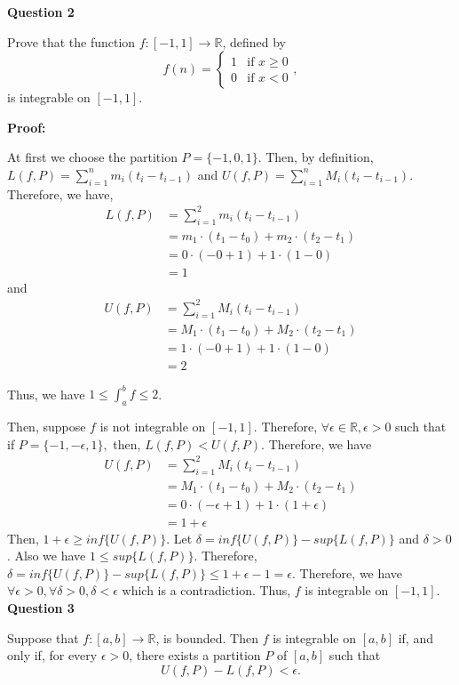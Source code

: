 \documentclass[a4paper,12pt]{report}
\newcommand{\R}{\mathbb{R}}
\begin{document}
\noindent
\textbf{Question 2}

\noindent
Prove that the function $f:[-1,1]\to\R$,
defined by 
\[
f(n) = \begin{cases} 1 &\mbox{if } x\geq 0 \\
0 & \mbox{if } x<0 \end{cases},
\]
is integrable on $[-1,1]$. 

\noindent
\textbf{Proof:}

\noindent
At first we choose the partition $P=\{-1,0,1\}$. Then, by definition, $L(f,P)=\sum_{i=1}^{n}m_i(t_i-t_{i-1})$ and $U(f,P)=\sum_{i=1}^{n}M_i(t_i-t_{i-1})$. Therefore, we have, 
\begin{align*}
L(f,P)&=\sum_{i=1}^{2}m_i(t_i-t_{i-1})\\
&=m_1\cdot{(t_1-t_0)}+m_2\cdot{(t_2-t_1)}\\
&=0\cdot{(-0+1)}+1\cdot{(1-0)}\\
&=1
\end{align*}
and 
\begin{align*}
U(f,P)&=\sum_{i=1}^{2}M_i(t_i-t_{i-1})\\
&=M_1\cdot{(t_1-t_0)}+M_2\cdot{(t_2-t_1)}\\
&=1\cdot{(-0+1)} + 1\cdot{(1-0)}\\
&=2
\end{align*}

\noindent
Thus, we have $1\leq \int_{a}^{b}f\leq 2$.

\noindent
Then, suppose $f$ is not integrable on $[-1,1]$. Therefore, $\forall \epsilon\in \mathbb{R}, \epsilon>0$ such that if $P=\{-1,-\epsilon,1\},$ then, $L(f,P)<U(f,P)$. Therefore, we have 
\begin{align*}
U(f,P)&=\sum_{i=1}^{2}M_i(t_i-t_{i-1})\\
&=M_1\cdot{(t_1-t_0)}+M_2\cdot{(t_2-t_1)}\\
&=0\cdot{(-\epsilon+1)}+1\cdot{(1+\epsilon)}\\
&=1+\epsilon
\end{align*}
Then, $1+\epsilon\geq inf\{U(f,P)\}$. Let $\delta=inf\{U(f,P)\}-sup\{L(f,P)\}$ and $\delta >0$. Also we have $1\leq sup\{L(f,P)\}$. Therefore, $\delta =  inf\{U(f,P)\}-sup\{L(f,P)\} \leq 1+\epsilon-1=\epsilon$. Therefore, we have $\forall \epsilon>0, \forall \delta>0, \delta<\epsilon$ which is a contradiction. Thus, $f$ is integrable on $[-1,1]$.  \\

\noindent
\textbf{Question 3}

\noindent
Suppose that $f:[a,b]\to\R$,
is bounded. Then $f$ is integrable on $[a,b]$
if, and only if, for every $\epsilon>0$, there
exists a partition $P$ of $[a,b]$ such
that
\[
U(f,P)-L(f,P)<\epsilon.
\]
\end{document}
